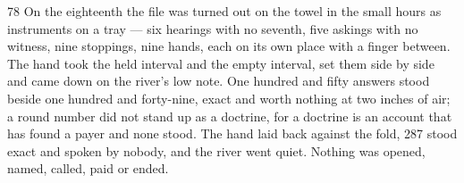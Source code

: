 \begin{CRchronicle}{78}
On the eighteenth the file was turned out on the towel in the small hours as instruments on a tray — six hearings with no seventh, five askings with no witness, nine stoppings, nine hands, each on its own place with a finger between. The hand took the held interval and the empty interval, set them side by side and came down on the river’s low note. One hundred and fifty answers stood beside one hundred and forty-nine, exact and worth nothing at two inches of air; a round number did not stand up as a doctrine, for a doctrine is an account that has found a payer and none stood. The hand laid back against the fold, 287 stood exact and spoken by nobody, and the river went quiet. Nothing was opened, named, called, paid or ended.
\end{CRchronicle}
